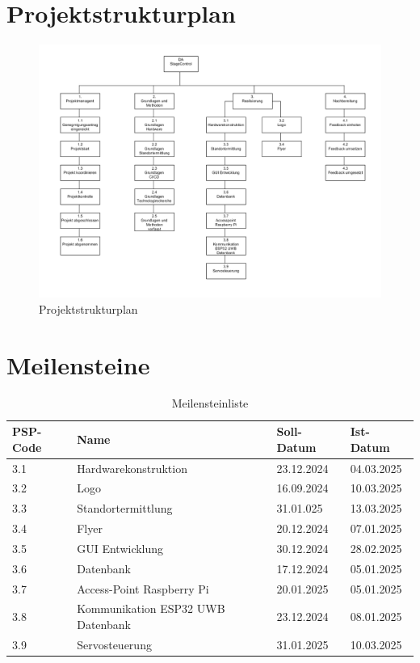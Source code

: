 \section*{Projektstrukturplan}
\begin{figure}[H]
	\centering
	\includegraphics[width=1.0\linewidth]{images/PSP.png}
	\caption[Projektstrukturplan]{Projektstrukturplan}
	\label{fig:projektstrukturplan}
\end{figure}
\newpage

\section*{Meilensteine}
\begin{table}[h]
	\centering
	\begin{tabular}{p{3cm} p{7cm} p{2cm} p{2cm}}
		\hline
		\textbf{PSP-Code} & \textbf{Name} & \textbf{Soll-Datum} & \textbf{Ist-Datum} \\
		\hline
		3.1 & Hardwarekonstruktion & 23.12.2024 & 04.03.2025 \\
		3.2 & Logo & 16.09.2024  & 10.03.2025 \\
		3.3 & Standortermittlung & 31.01.025 & 13.03.2025 \\
		3.4 & Flyer & 20.12.2024 & 07.01.2025 \\
		3.5 & GUI Entwicklung & 30.12.2024 & 28.02.2025 \\
		3.6 & Datenbank & 17.12.2024 & 05.01.2025 \\
		3.7 & Access-Point Raspberry Pi & 20.01.2025 & 05.01.2025 \\
		3.8 & Kommunikation ESP32 UWB Datenbank & 23.12.2024  & 08.01.2025 \\
		3.9 & Servosteuerung & 31.01.2025 & 10.03.2025 \\
		\hline
	\end{tabular}
	\caption{Meilensteinliste}
	\label{tab:Meilensteinliste}
\end{table}
\newpage

